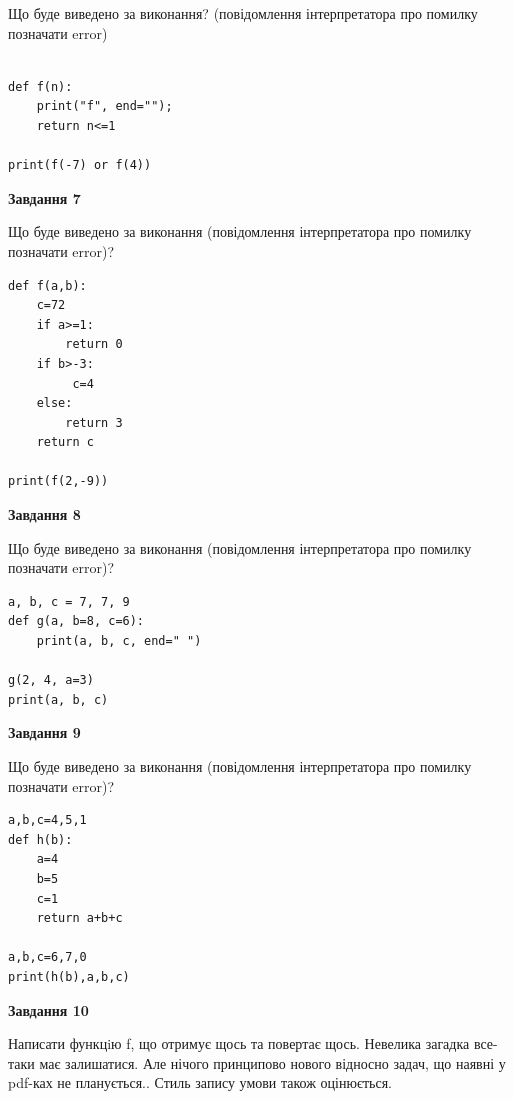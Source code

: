 \documentclass[12pt, ukrainian]{article}
\begin{document}
{\begin {large}
Що буде виведено за виконання? (повідомлення інтерпретатора про помилку позначати error)\par
\begin{verbatim}

def f(n):
    print("f", end="");
    return n<=1

print(f(-7) or f(4))
\end{verbatim}

{\begin {center}\textbf{Завдання 7}\end {center}}

Що буде виведено за виконання (повідомлення інтерпретатора про помилку позначати error)?\par
\begin{verbatim}
def f(a,b):
    c=72
    if a>=1:
        return 0
    if b>-3:
         c=4
    else: 
        return 3
    return c

print(f(2,-9))
\end{verbatim}

{\begin {center}\textbf{Завдання 8}\end {center}}

Що буде виведено за виконання (повідомлення інтерпретатора про помилку позначати error)?\par
\begin{verbatim}
a, b, c = 7, 7, 9
def g(a, b=8, c=6):
    print(a, b, c, end=" ")

g(2, 4, a=3)
print(a, b, c)
\end{verbatim}

{\begin {center}\textbf{Завдання 9}\end {center}}

Що буде виведено за виконання (повідомлення інтерпретатора про помилку позначати error)?\par
\begin{verbatim}
a,b,c=4,5,1
def h(b):
    a=4
    b=5
    c=1
    return a+b+c

a,b,c=6,7,0
print(h(b),a,b,c)
\end{verbatim}

{\begin {center}\textbf{Завдання 10}\end {center}}


Написати функцiю f, що отримує щось та повертає щось. Невелика загадка все-таки має залишатися. Але нічого принципово нового відносно задач, що наявні у pdf-ках не планується.. Стиль запису умови також оцінюється.\par
\end {large}}
\newpage
\end{document}
